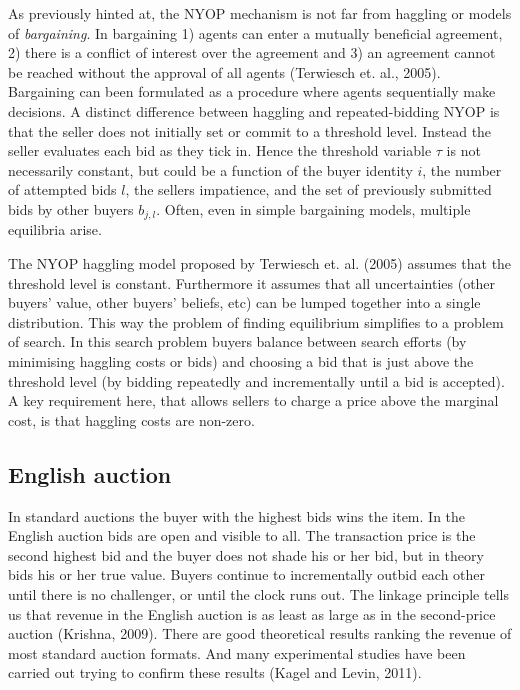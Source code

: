 \documentclass[a4paper,12pt]{article}
\begin{document}
	As previously hinted at, the NYOP mechanism is not far from haggling or models of {\it bargaining}. In bargaining 1) agents can enter a mutually beneficial agreement, 2) there is a conflict of interest over the agreement and 3) an agreement cannot be reached without the approval of all agents (Terwiesch et. al., 2005). Bargaining can been formulated as a procedure where agents sequentially make decisions. A distinct difference between haggling and repeated-bidding NYOP is that the seller does not initially set or commit to a threshold level. Instead the seller evaluates each bid as they tick in. Hence the threshold variable $\tau$ is not necessarily constant, but could be a function of the buyer identity $i$, the number of attempted bids $l$, the sellers impatience, and the set of previously submitted bids by other buyers $b_{j,l}$. Often, even in simple bargaining models, multiple equilibria arise.

	The NYOP haggling model proposed by Terwiesch et. al. (2005) assumes that the threshold level is constant. Furthermore it assumes that all uncertainties (other buyers' value, other buyers' beliefs, etc) can be lumped together into a single distribution. This way the problem of finding equilibrium simplifies to a problem of search. In this search problem buyers balance between search efforts (by minimising haggling costs or bids) and choosing a bid that is just above the threshold level (by bidding repeatedly and incrementally until a bid is accepted). A key requirement here, that allows sellers to charge a price above the marginal cost, is that haggling costs are non-zero.

	\subsection{English auction}

	In standard auctions the buyer with the highest bids wins the item. In the English auction bids are open and visible to all. The transaction price is the second highest bid and the buyer does not shade his or her bid, but in theory bids his or her true value. Buyers continue to incrementally outbid each other until there is no challenger, or until the clock runs out. The linkage principle tells us that revenue in the English auction is as least as large as in the second-price auction (Krishna, 2009). There are good theoretical results ranking the revenue of most standard auction formats. And many experimental studies have been carried out trying to confirm these results (Kagel and Levin, 2011). 
\end{document}
